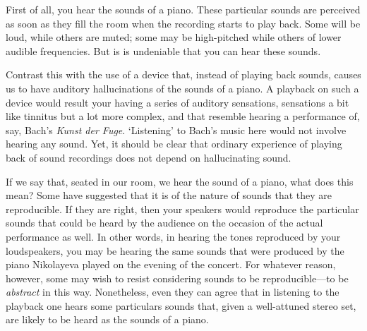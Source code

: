 \documentclass[sloppy, journal, git, bytitle, dodraft]{humapap}
\begin{document}
First of all, you hear the sounds of a piano. These particular sounds are perceived as soon as they fill the room when the recording starts to play back. Some will be loud, while others are muted; some may be high-pitched while others of lower audible frequencies. But is is undeniable that you can hear these sounds.   

Contrast this with the use of a device that, instead of playing back sounds, causes us to have auditory hallucinations of the sounds of a piano. A playback on such a device would result your having a series of auditory sensations, sensations a bit like tinnitus but a lot more complex, and that resemble hearing a performance of, say, Bach's \emph{Kunst der Fuge}. `Listening' to Bach's music here would not involve hearing any sound. Yet, it should be clear that ordinary experience of playing back of sound recordings does not depend on hallucinating sound. 

If we say that, seated in our room, we hear the sound of a piano, what does this mean? Some have suggested that it is of the nature of sounds that they are reproducible. If they are right, then your speakers would \emph{re}produce the particular sounds that could be heard by the audience on the occasion of the actual performance as well. In other words, in hearing the tones reproduced by your loudspeakers, you may be hearing the same sounds that were produced by the piano Nikolayeva played on the evening of the concert. For whatever reason, however, some may wish to resist considering sounds to be reproducible---to be \emph{abstract} in this way. Nonetheless, even they can agree that in listening to the playback one hears some particulars sounds that, given a well-attuned stereo set, are likely to be heard as the sounds of a piano. %
\end{document}

